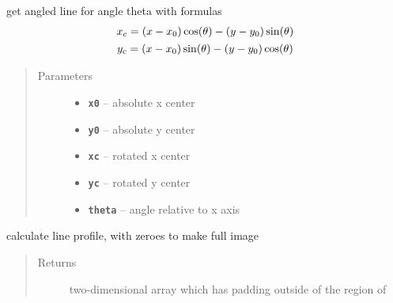 \documentclass[letterpaper,10pt,english]{sphinxmanual}
\begin{document}
\begin{fulllineitems}
\begin{fulllineitems}
\label{fit_object:Fitobject.fit_object.get_angled_line}
get angled line for angle theta with formulas
\begin{gather}
\begin{split}x_c = (x-x_0) \cos(\theta) - (y-y_0) \sin(\theta)\end{split}\notag\\\begin{split}y_c = (x-x_0) \sin(\theta) - (y-y_0) \cos(\theta)\end{split}\notag
\end{gather}\begin{quote}\begin{description}
\item[{Parameters}] \leavevmode\begin{itemize}
\item {} 
\textbf{\texttt{x0}} -- absolute x center

\item {} 
\textbf{\texttt{y0}} -- absolute y center

\item {} 
\textbf{\texttt{xc}} -- rotated x center

\item {} 
\textbf{\texttt{yc}} -- rotated y center

\item {} 
\textbf{\texttt{theta}} -- angle relative to x axis

\end{itemize}

\end{description}\end{quote}

\end{fulllineitems}


\begin{fulllineitems}
\label{fit_object:Fitobject.fit_object.line_profile}
calculate line profile, with zeroes to make full image
\begin{quote}\begin{description}
\item[{Returns}] \leavevmode
two-dimensional array which has padding outside of the region of


\end{description}
\end{quote}
\end{fulllineitems}
\end{fulllineitems}
\end{document}
